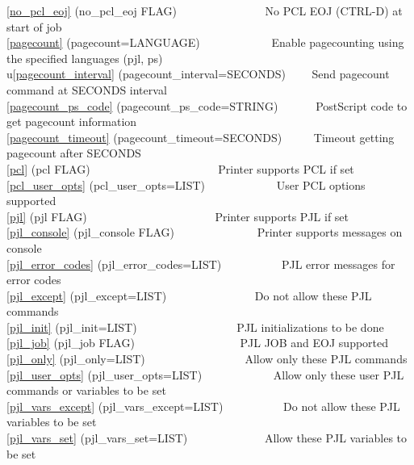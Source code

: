 \documentclass[a4paper]{article}
\begin{document}
{\ttfamily \ref{no_pcl_eoj} {(no\_pcl\_eoj FLAG)}}{\ttfamily ~~~~~~~~~~~~~~~} No PCL EOJ (CTRL-D) at start of job \\ 
{\ttfamily \ref{pagecount} {(pagecount=LANGUAGE)}}{\ttfamily ~~~~~~~~~~~~} Enable pagecounting using the specified languages (pjl, ps) \\ 
u{\ttfamily \ref{pagecount_interval} {(pagecount\_interval=SECONDS)}}{\ttfamily ~~~~} Send pagecount command at SECONDS interval \\ 
{\ttfamily \ref{pagecount_ps_code} {(pagecount\_ps\_code=STRING)}}{\ttfamily ~~~~~~} PostScript code to get pagecount information \\ 
{\ttfamily \ref{pagecount_timeout} {(pagecount\_timeout=SECONDS)}}{\ttfamily ~~~~~} Timeout getting pagecount after SECONDS \\ 
{\ttfamily \ref{pcl} {(pcl FLAG)}}{\ttfamily ~~~~~~~~~~~~~~~~~~~~~~} Printer supports PCL if set \\ 
{\ttfamily \ref{pcl_user_opts} {(pcl\_user\_opts=LIST)}}{\ttfamily ~~~~~~~~~~~~} User PCL options supported \\ 
{\ttfamily \ref{pjl} {(pjl FLAG)}}{\ttfamily ~~~~~~~~~~~~~~~~~~~~~~} Printer supports PJL if set \\ 
{\ttfamily \ref{pjl_console} {(pjl\_console FLAG)}}{\ttfamily ~~~~~~~~~~~~~~} Printer supports messages on console \\ 
{\ttfamily \ref{pjl_error_codes} {(pjl\_error\_codes=LIST)}}{\ttfamily ~~~~~~~~~~} PJL error messages for error codes \\ 
{\ttfamily \ref{pjl_except} {(pjl\_except=LIST)}}{\ttfamily ~~~~~~~~~~~~~~~} Do not allow these PJL commands \\ 
{\ttfamily \ref{pjl_init} {(pjl\_init=LIST)}}{\ttfamily ~~~~~~~~~~~~~~~~~} PJL initializations to be done \\ 
{\ttfamily \ref{pjl_job} {(pjl\_job FLAG)}}{\ttfamily ~~~~~~~~~~~~~~~~~~} PJL JOB and EOJ supported \\ 
{\ttfamily \ref{pjl_only} {(pjl\_only=LIST)}}{\ttfamily ~~~~~~~~~~~~~~~~~} Allow only these PJL commands \\ 
{\ttfamily \ref{pjl_user_opts} {(pjl\_user\_opts=LIST)}}{\ttfamily ~~~~~~~~~~~~} Allow only these user PJL commands or variables to be set \\ 
{\ttfamily \ref{pjl_vars_except} {(pjl\_vars\_except=LIST)}}{\ttfamily ~~~~~~~~~~} Do not allow these PJL variables to be set \\ 
{\ttfamily \ref{pjl_vars_set} {(pjl\_vars\_set=LIST)}}{\ttfamily ~~~~~~~~~~~~~} Allow these PJL variables to be set \\ 
\end{document}

